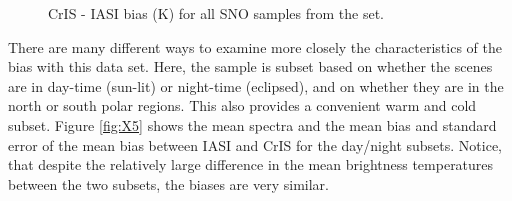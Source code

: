 \documentclass[twocolumn,10pt]{article}
\begin{document}
\begin{figure}[htb]
  \centering
  \caption{CrIS - IASI bias (K) for all SNO samples from the set.}
  \label{fig:X3}
\end{figure}

There are many different ways to examine more closely the characteristics of the bias with this data set. Here, the sample is subset based on whether the scenes are in day-time (sun-lit) or night-time (eclipsed), and on whether they are in the north or south polar regions. This also provides a convenient warm and cold subset. Figure \ref{fig:X5} shows the mean spectra and the mean bias and standard error of the mean bias between IASI and CrIS for the day/night subsets. Notice, that despite the
relatively large difference in the mean brightness temperatures between the two subsets, the biases are very similar.

\end{document}
